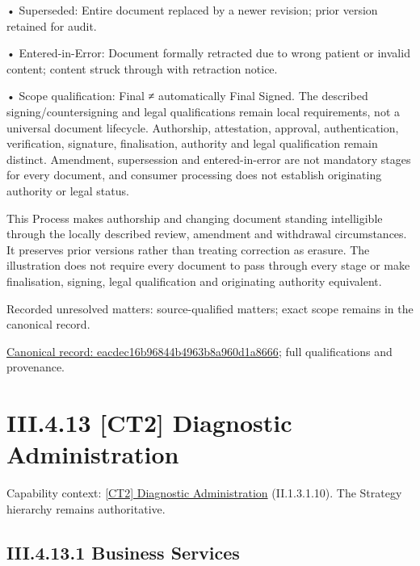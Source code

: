•
Superseded: Entire document replaced by a newer revision; prior version retained for audit.



•
Entered-in-Error: Document formally retracted due to wrong patient or invalid content; content struck through with retraction notice.



•
Scope qualification: Final ≠ automatically Final Signed. The described signing/countersigning and legal qualifications remain local requirements, not a universal document lifecycle. Authorship, attestation, approval, authentication, verification, signature, finalisation, authority and legal qualification remain distinct. Amendment, supersession and entered-in-error are not mandatory stages for every document, and consumer processing does not establish originating authority or legal status.



This Process makes authorship and changing document standing intelligible through the locally described review, amendment and withdrawal circumstances. It preserves prior versions rather than treating correction as erasure. The illustration does not require every document to pass through every stage or make finalisation, signing, legal qualification and originating authority equivalent.


{\small Recorded unresolved matters: source-qualified matters; exact scope remains in the canonical record.}\par
{\footnotesize \href{../../../../continuum/business/business-process/eacdec16b96844b4963b8a960d1a8666.md}{Canonical record: eacdec16b96844b4963b8a960d1a8666}; full qualifications and provenance.}\par
\section*{III.4.13 [CT2] Diagnostic Administration}
\label{navigation:III.4.13}

{\small Capability context: \hyperref[element:3cc720ba2e8b4d7a94bb349391d61895]{[CT2] Diagnostic Administration} (II.1.3.1.10). The Strategy hierarchy remains authoritative.}\par
\subsection*{III.4.13.1 Business Services}
\label{navigation:III.4.13.1}

